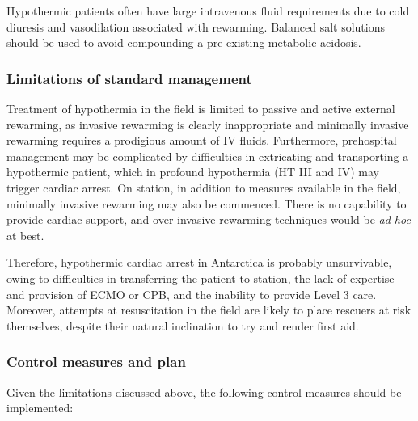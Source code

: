 \documentclass[12pt,a4paper]{article}
\begin{document}
Hypothermic patients often have large intravenous fluid requirements due to cold diuresis and vasodilation associated with rewarming.\cite{Soar:2010kd} Balanced salt solutions should be used to avoid compounding a pre-existing metabolic acidosis.\cite{PowellTuck:2011us}

\subsubsection{Limitations of standard management}

Treatment of hypothermia in the field is limited to passive and active external rewarming, as invasive rewarming is clearly inappropriate and minimally invasive rewarming requires a prodigious amount of IV fluids. Furthermore, prehospital management may be complicated by difficulties in extricating and transporting a hypothermic patient, which in profound hypothermia (HT III and IV) may trigger cardiac arrest. On station, in addition to measures available in the field, minimally invasive rewarming may also be commenced. There is no capability to provide cardiac support, and over invasive rewarming techniques would be \emph{ad hoc} at best.

Therefore, hypothermic cardiac arrest in Antarctica is probably unsurvivable, owing to difficulties in transferring the patient to station, the lack of expertise and provision of ECMO or CPB, and the inability to provide Level 3 care. Moreover, attempts at resuscitation in the field are likely to place rescuers at risk themselves, despite their natural inclination to try and render first aid.

\subsubsection{Control measures and plan}

Given the limitations discussed above, the following control measures should be implemented:
\end{document}
